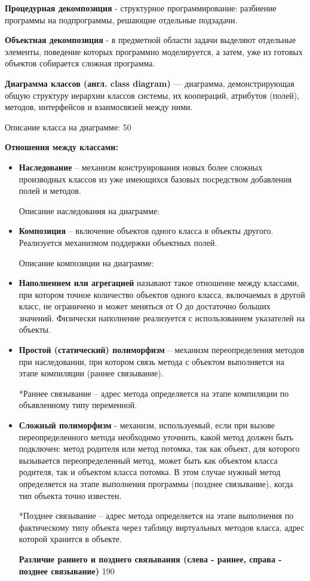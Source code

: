 {\bf {Процедурная декомпозиция}} - структурное программирование: разбиение программы на подпрограммы, решающие отдельные подзадачи.

{\bf {Объектная декомпозиция}} - в предметной области задачи выделяют отдельные элементы, поведение которых программно моделируется, а затем, уже из готовых объектов собирается сложная программа.

{\bf {Диаграмма классов (англ. class diagram)}} — диаграмма, демонстрирующая общую структуру иерархии классов системы, их коопераций, атрибутов (полей), методов, интерфейсов и взаимосвязей между ними.

Описание класса на диаграмме:
 {50}

{\bf{Отношения между классами:}}
\begin{itemize}
\item{\bf {Наследование}} – механизм конструирования новых более сложных производных классов из уже имеющихся базовых посредством добавления полей и методов. 

Описание наследования на диаграмме:

\item{\bf {Композиция}} – включение объектов одного класса в объекты другого. Реализуется механизмом поддержки объектных полей.

Описание композиции на диаграмме:

\item{\bf {Наполнением или агрегацией}} называют такое отношение между классами, при котором точное количество объектов одного класса, включаемых в 
другой класс, не ограничено и может меняться от О до достаточно больших 
значений. Физически наполнение реализуется с использованием указателей 
на объекты.



\item{\bf{Простой (статический) полиморфизм}} – механизм переопределения методов при наследовании, при котором связь метода с объектом выполняется на этапе компиляции (раннее связывание).

*Раннее связывание – адрес метода определяется на этапе компиляции по объявленному типу переменной.

\item {\bf{Сложный полиморфизм}} - механизм, используемый, если при вызове переопределенного метода необходимо уточнить, какой метод должен быть подключен: метод 
родителя или метод потомка, так как объект, для которого вызывается переопределенный метод, может быть как объектом класса родителя, так и объектом класса потомка. В этом случае нужный метод определяется на этапе выполнения программы (позднее связывание), когда тип объекта точно известен.

*Позднее связывание – адрес метода определяется на этапе выполнения по фактическому типу объекта через таблицу виртуальных методов класса, адрес которой хранится в объекте.

\newpage
{\bf{Различие раннего и позднего связывания (слева - раннее, справа - позднее связывание)}}
 {190} 
\end{itemize}

